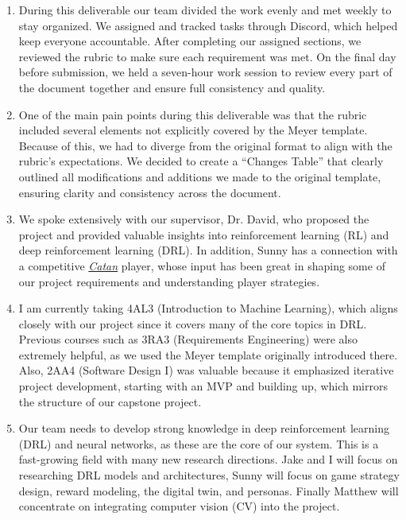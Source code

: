 \documentclass{article}
\newcommand{\Catan}{\href{https://en.wikipedia.org/wiki/Catan}{Catan}}
\begin{document}
\begin{enumerate}
    \item During this deliverable our team divided the work evenly and met weekly to stay 
    organized. We assigned and tracked tasks through Discord, which 
    helped keep everyone accountable. After completing our assigned
     sections, we reviewed the rubric to make sure each requirement
      was met. On the final day before submission, we held a seven-hour
      work session to review every part of the document together and
       ensure full consistency and quality.

    \item One of the main pain points during this deliverable was that the rubric included
    several elements not explicitly covered by the Meyer template.
     Because of this, we had to diverge from the original format to 
     align with the rubric’s expectations. We decided to create
      a “Changes Table” that clearly outlined all modifications and
       additions we made to the original template, ensuring clarity
        and consistency across the document.

    \item We spoke extensively with our supervisor, Dr. David,
     who proposed the project and provided valuable insights into 
     reinforcement learning (RL) and deep reinforcement learning (DRL).
      In addition, Sunny has a connection with a competitive 
      \emph{\Catan{}} player, whose input has been great in
     shaping some of our project requirements and understanding 
       player strategies.

    \item I am currently taking 4AL3 (Introduction to Machine Learning),
     which aligns closely with our project since it covers many of the
      core topics in DRL. Previous courses such as 3RA3 (Requirements Engineering)
       were also extremely helpful, as we used the Meyer template
        originally introduced there. Also, 2AA4 (Software Design I)
         was valuable because it emphasized iterative project development, starting
          with an MVP and building up, which mirrors the structure of our capstone project.

    \item Our team needs to develop strong knowledge in deep reinforcement learning (DRL)
     and neural networks, as these are the core of our system. This is a fast-growing field
      with many new research directions. Jake and I will focus on researching DRL models 
      and architectures, Sunny will focus on game strategy design, reward modeling, the digital twin,
      and personas. Finally Matthew will concentrate on integrating computer vision (CV) into the project.


\end{enumerate}
\end{document}
